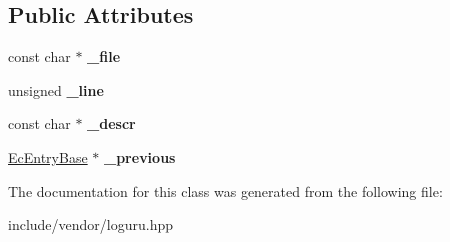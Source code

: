 \subsection*{Public Attributes}
\begin{DoxyCompactItemize}
\item 
\mbox{\label{classloguru_1_1_ec_entry_base_a2973db9b0f3ed0e4e677a14180750d64}} 
const char $\ast$ {\bfseries \+\_\+file}
\item 
\mbox{\label{classloguru_1_1_ec_entry_base_aeb854af3a713401ba619c4a26b5fbb0a}} 
unsigned {\bfseries \+\_\+line}
\item 
\mbox{\label{classloguru_1_1_ec_entry_base_a68dc2d49b602fbeaba578e9e357100ce}} 
const char $\ast$ {\bfseries \+\_\+descr}
\item 
\mbox{\label{classloguru_1_1_ec_entry_base_ade23be6579f259f90d81ce6d36332863}} 
\mbox{\hyperlink{classloguru_1_1_ec_entry_base}{Ec\+Entry\+Base}} $\ast$ {\bfseries \+\_\+previous}
\end{DoxyCompactItemize}


The documentation for this class was generated from the following file\+:\begin{DoxyCompactItemize}
\item 
include/vendor/loguru.\+hpp\end{DoxyCompactItemize}
